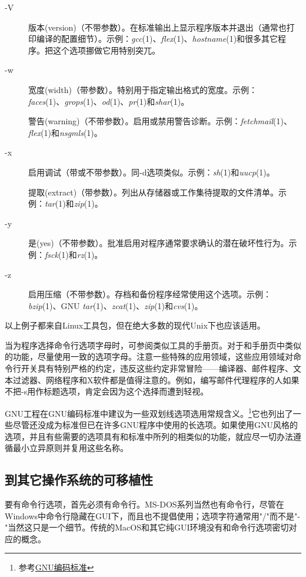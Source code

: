 \documentclass[12pt,oneside]{ctexbook}
\begin{document}
\begin{common-format}
\begin{description}
\item[-V] 版本(version)（不带参数）。在标准输出上显示程序版本并退出（通常也打印编译的配置细节）。示例：\textit{gcc}(1)、\textit{flex}(1)、\textit{hostname}(1)和很多其它程序。把这个选项挪做它用特别突兀。

\item[-w] 宽度(width)（带参数）。特别用于指定输出格式的宽度。示例：\\ \textit{faces}(1)、\textit{grops}(1)、\textit{od}(1)、\textit{pr}(1)和\textit{shar}(1)。

警告(warning)（不带参数）。启用或禁用警告诊断。示例：\textit{fetchmail}(1)、\textit{flex}(1)和\textit{nsgmls}(1)。

\item[-x] 启用调试（带或不带参数）。同-d选项类似。示例：\textit{sh}(1)和\textit{uucp}(1)。

提取(extract)（带参数）。列出从存储器或工作集待提取的文件清单。示例：\textit{tar}(1)和\textit{zip}(1)。

\item[-y] 是(yes)（不带参数）。批准启用对程序通常要求确认的潜在破坏性行为。示例：\textit{fsck}(1)和\textit{rz}(1)。

\item[-z] 启用压缩（不带参数）。存档和备份程序经常使用这个选项。示例：\textit{bzip}(1)、GNU \textit{tar}(1)、\textit{zcat}(1)、\textit{zip}(1)和\textit{cvs}(1)。
\end{description}

以上例子都来自Linux工具包，但在绝大多数的现代Unix下也应该适用。

当为程序选择命令行选项字母时，可参阅类似工具的手册页。对于和手册页中类似的功能，尽量使用一致的选项字母。注意一些特殊的应用领域，这些应用领域对命令行开关具有特别严格的约定，违反这些约定非常冒险——编译器、邮件程序、文本过滤器、网络程序和X软件都是值得注意的。例如，编写邮件代理程序的人如果不把-s用作标题选项，肯定会因为这个选择而遭到轻视。

GNU工程在GNU编码标准中建议为一些双划线选项选用常规含义。\footnote{参考\href{http://www.gnu.org/prep/standards.html}{GNU编码标准}}它也列出了一些尽管还没成为标准但已在许多GNU程序中使用的长选项。如果使用GNU风格的选项，并且有些需要的选项具有和标准中所列的相类似的功能，就应尽一切办法遵循最小立异原则并复用这些名称。

\subsection{到其它操作系统的可移植性}
要有命令行选项，首先必须有命令行。MS-DOS系列当然也有命令行，尽管在Windows中命令行隐藏在GUI下，而且也不提倡使用；选项字符通常用"/"而不是"-"当然这只是一个细节。传统的MacOS和其它纯GUI环境没有和命令行选项密切对应的概念。



\end{common-format}
\end{document}

